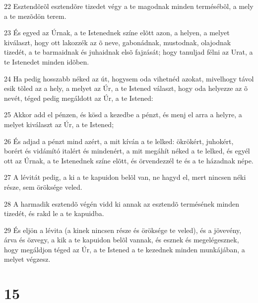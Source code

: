 \par 22 Esztendõrõl esztendõre tizedet végy a te magodnak minden termésébõl, a mely a te mezõdön terem.
\par 23 És egyed az Úrnak, a te Istenednek színe elõtt azon, a helyen, a melyet kiválaszt, hogy ott lakozzék az õ neve, gabonádnak, mustodnak, olajodnak tizedét, a te barmaidnak és juhaidnak elsõ fajzását; hogy tanuljad félni az Urat, a te Istenedet minden idõben.
\par 24 Ha pedig hosszabb néked az út, hogysem oda vihetnéd azokat, mivelhogy távol esik tõled az a hely, a melyet az Úr, a te Istened választ, hogy oda helyezze az õ nevét, téged pedig megáldott az Úr, a te Istened:
\par 25 Akkor add el pénzen, és kösd a kezedbe a pénzt, és menj el arra a helyre, a melyet kiválaszt az Úr, a te Istened;
\par 26 És adjad a pénzt mind azért, a mit kíván a te lelked: ökrökért, juhokért, borért és vidámító italért és mindenért, a mit megáhít néked a te lelked, és egyél ott az Úrnak, a te Istenednek színe elõtt, és örvendezzél te és  a te házadnak népe.
\par 27 A lévitát pedig, a ki a te kapuidon belõl van, ne hagyd el, mert nincsen néki része, sem öröksége veled.
\par 28 A harmadik esztendõ végén vidd ki annak az esztendõ termésének minden tizedét, és rakd le a te kapuidba.
\par 29 És eljön a lévita (a kinek nincsen része és öröksége te veled), és a jövevény, árva és özvegy, a kik a te kapuidon belõl vannak, és esznek és megelégesznek, hogy megáldjon téged az Úr, a te Istened a te kezednek minden munkájában, a melyet végzesz.

\chapter{15}

